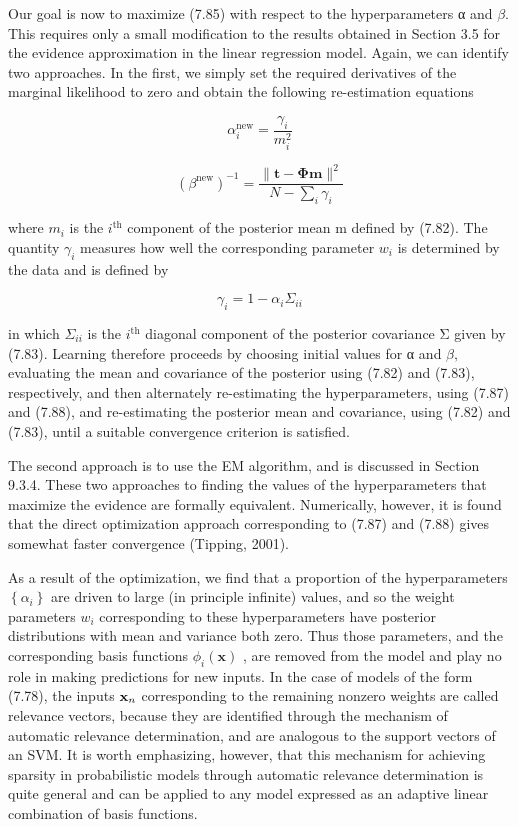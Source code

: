 \documentclass[
  10
]{article}
\begin{document}
Our goal is now to maximize (7.85) with respect to the hyperparameters α
and \(\beta .\) This requires only a small modification to the results
obtained in Section 3.5 for the evidence approximation in the linear
regression model. Again, we can identify two approaches. In the first,
we simply set the required derivatives of the marginal likelihood to
zero and obtain the following re-estimation equations

\[
\alpha_ {i} ^ {\mathrm{new}} = \frac {\gamma_ {i}}{m _ {i} ^ {2}}\tag{7.87}
\]

\[
(\beta^ {\mathrm{new}}) ^ {- 1} = \frac {\| \mathbf {t} - \boldsymbol {\Phi} \mathbf {m} \| ^ {2}}{N - \sum_ {i} \gamma_ {i}}\tag{7.88}
\]

where \(m _ { i }\) is the \(i ^ { \mathrm { t h } }\) component of the
posterior mean m defined by (7.82). The quantity \(\gamma _ { i }\)
measures how well the corresponding parameter \(w _ { i }\) is
determined by the data and is defined by

\[
\gamma_ {i} = 1 - \alpha_ {i} \Sigma_ {i i}\tag{7.89}
\]

in which \(\Sigma _ { i i }\) is the \(i ^ { \mathrm { t h } }\)
diagonal component of the posterior covariance Σ given by (7.83).
Learning therefore proceeds by choosing initial values for α and
\(\beta ,\) evaluating the mean and covariance of the posterior using
(7.82) and (7.83), respectively, and then alternately re-estimating the
hyperparameters, using (7.87) and (7.88), and re-estimating the
posterior mean and covariance, using (7.82) and (7.83), until a suitable
convergence criterion is satisfied.

The second approach is to use the EM algorithm, and is discussed in
Section 9.3.4. These two approaches to finding the values of the
hyperparameters that maximize the evidence are formally equivalent.
Numerically, however, it is found that the direct optimization approach
corresponding to (7.87) and (7.88) gives somewhat faster convergence
(Tipping, 2001).

As a result of the optimization, we find that a proportion of the
hyperparameters \(\left\{ \alpha _ { i } \right\}\) are driven to large
(in principle infinite) values, and so the weight parameters
\(w _ { i }\) corresponding to these hyperparameters have posterior
distributions with mean and variance both zero. Thus those parameters,
and the corresponding basis functions \(\phi _ { i } ( \mathbf { x } )\)
, are removed from the model and play no role in making predictions for
new inputs. In the case of models of the form (7.78), the inputs
\({ \bf x } _ { n }\) corresponding to the remaining nonzero weights are
called relevance vectors, because they are identified through the
mechanism of automatic relevance determination, and are analogous to the
support vectors of an SVM. It is worth emphasizing, however, that this
mechanism for achieving sparsity in probabilistic models through
automatic relevance determination is quite general and can be applied to
any model expressed as an adaptive linear combination of basis
functions.
\end{document}
